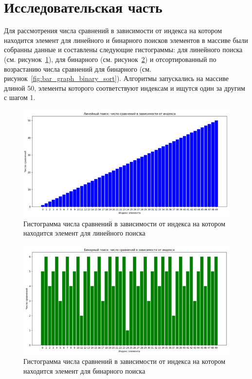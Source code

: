\section{Исследовательская часть}

\hspace{1.25cm}
Для рассмотрения числа сравнений в зависимости от индекса на котором находится элемент для линейного и бинарного поисков элементов в массиве были собранны данные и составлены следующие гистограммы: для линейного поиска (см. рисунок~\ref{fig:bar_graph_linear}), для бинарного (см. рисунок~\ref{fig:bar_graph_binary}) и отсортированный по возрастанию числа сравнений для бинарного (см. рисунок~\ref{fig:bar_graph_binary_sort}). Алгоритмы запускались на массиве длиной 50, элементы которого соответствуют индексам и ищутся один за другим с шагом 1.

\begin{figure}[H]
    \centering
    \includegraphics[width=1\textwidth]{img/bar_graph_linear.png}
    \caption{Гистограмма числа сравнений в зависимости от индекса на котором находится элемент для линейного поиска}
    \label{fig:bar_graph_linear} %
\end{figure}

\begin{figure}[H]
    \centering
    \includegraphics[width=1\textwidth]{img/bar_graph_binary.png}
    \caption{Гистограмма числа сравнений в зависимости от индекса на котором находится элемент для бинарного поиска}
    \label{fig:bar_graph_binary} %
\end{figure}

